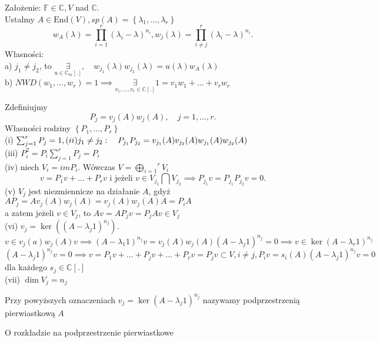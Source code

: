 \documentclass[../main.tex]{subfiles}
\begin{document}
Założenie: $\mathbb{F}\in \mathbb{C}, V$ nad  $\mathbb{C}$.\\
Ustalmy $A\in \text{End} (V), sp(A) = \left\{ \lambda_1, \ldots, \lambda_r \right\} $
\[
    w_A(\lambda) = \prod_{i=1}^r (\lambda_i - \lambda)^{n_i}, w_j(\lambda) = \prod_{i\neq j}^r (\lambda_i - \lambda)^{n_i}
.\]
Własności:\\
a) $j_1 \neq j_2$, to $\underset{u\in \mathbb{C}_m [.]}{\exists},\quad w_{j_1}(\lambda) w_{j_2}(\lambda) = u(\lambda)w_A(\lambda)$\\
b) $NWD(w_1,\ldots,w_r) = 1 \implies \underset{v_1,\ldots,v_r \in \mathbb{C}[.]}{\exists} 1 = v_1 w_1+ \ldots + v_r w_r$

Zdefiniujmy \[
    P_j = v_j(A) w_j(A),\quad j=1,\ldots,r
.\]
Własności rodziny $\left\{ P_1,\ldots,P_r \right\} $ \\
(i) $\sum_{j=1}^{r} {P_j = 1}, \\
(ii) j_1 \neq j_2:\quad P_{j_1} P_{j_2} = v_{j_1}(A) v_{j_2}(A) w_{j_1}(A) w_{j_2}(A)$ \\
(iii) $P_i^2 = P_i \sum_{j=1}^{r} P_j = P_i$ \\
(iv) niech $V_i = im P_i$. Wówczas $V = \overset{r}{\underset{i = 1}{\bigoplus}} V_i$\\

\[
    v = P_1 v + \ldots + P_r v \text{ i jeżeli } v\in V_{j_1} \bigcap V_{j_2} \implies P_{j_1} v = P_{j_1}P_{j_2} v = 0
.\]
(v) $V_j$ jest niezmiennicze na działanie $A$, gdyż $A P_j = A v_j(A) w_j (A) = v_j (A) w_j (A) A = P_i A$\\
a zatem jeżeli $v\in V_j$, to $A v = A P_j v = P_j A v \in V_j$\\
(vi)  $v_j = \ker \left( (A - \lambda_j 1)^{n_j} \right).$ $v\in v_j(a) w_j(A) v \implies (A - \lambda_1 1)^{n_j}v = v_j(A)w_j(A)(A - \lambda_j 1)^{n_j} = 0 \implies v\in \ker(A - \lambda_r 1)^{n_j}$\\
$(A-\lambda_j 1)^{n_j} v = 0 \implies v = P_1 v + \ldots + P_j v + \ldots + P_r v = P_j v \subset V, i\neq j, P_i v = s_i(A) (A - \lambda_j 1)^{n_j} v = 0$ dla każdego $s_j\in \mathbb{C}[.]$\\
(vii) $\dim V_j = n_j$

\begin{definicja}
    Przy powyższych oznaczeniach $v_j = \ker (A - \lambda_j 1)^{n_j}$ nazywamy podprzestrzenią pierwiastkową $A$
\end{definicja}

\begin{tw}
    O rozkładzie na podprzestrzenie pierwiastkowe
\end{tw}
\end{document}
